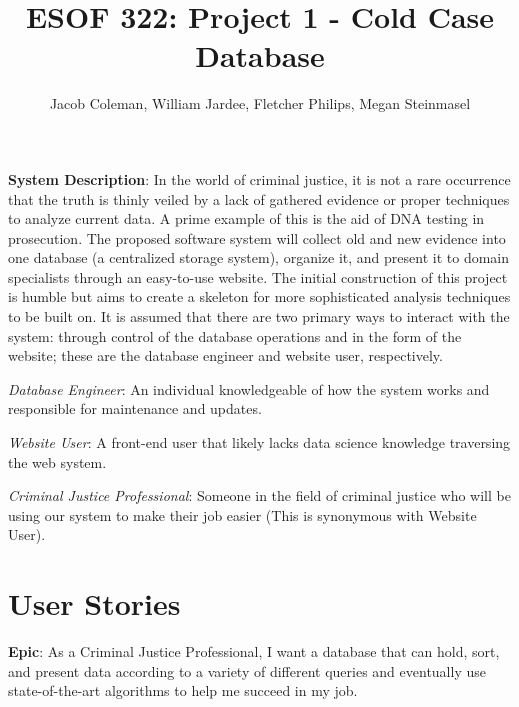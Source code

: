 \documentclass[11pt]{article}
\begin{document}
\title{ESOF 322: Project 1 - Cold Case Database}
\author{Jacob Coleman, William Jardee, Fletcher Philips, Megan Steinmasel}
\maketitle




\textbf{System Description}: In the world of criminal justice, it is not a rare occurrence that the truth is thinly veiled by a lack of gathered evidence or proper techniques to analyze current data. A prime example of this is the aid of DNA testing in prosecution. The proposed software system will collect old and new evidence into one database (a centralized storage system), organize it, and present it to domain specialists through an easy-to-use website. The initial construction of this project is humble but aims to create a skeleton for more sophisticated analysis techniques to be built on. It is assumed that there are two primary ways to interact with the system: through control of the database operations and in the form of the website; these are the database engineer and website user, respectively.\vspace{1.5em}

\textit{Database Engineer}: An individual knowledgeable of how the system works and responsible for maintenance and updates.\vspace{0.5em}

\textit{Website  User}: A front-end user that likely lacks data science knowledge traversing the web system.\vspace{0.5em}

\textit{Criminal Justice Professional}: Someone in the field of criminal justice who will be using our system to make their job easier (This is synonymous with Website User).\vspace{0.5em}

\vspace{1em}


\section*{User Stories}

\noindent\textbf{Epic}: As a Criminal Justice Professional, I want a database that can hold, sort, and present data according to a variety of different queries and eventually use state-of-the-art algorithms to help me succeed in my job.\vspace{0.5em}
\end{document}
